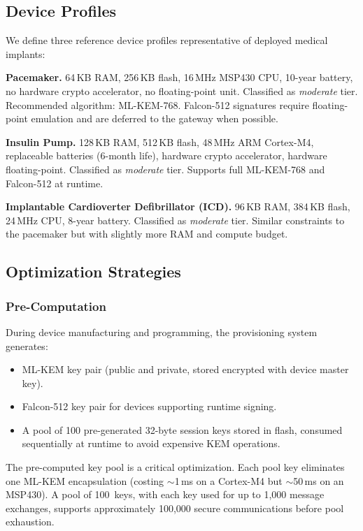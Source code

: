 \documentclass[conference,10pt]{IEEEtran}
\newcommand{\mlkem}{\textsf{ML-KEM}}
\begin{document}
\subsection{Device Profiles}

We define three reference device profiles representative of deployed medical implants:

\textbf{Pacemaker.} 64\,KB RAM, 256\,KB flash, 16\,MHz MSP430 CPU, 10-year battery, no hardware crypto accelerator, no floating-point unit. Classified as \emph{moderate} tier. Recommended algorithm: \mlkem{}-768. Falcon-512 signatures require floating-point emulation and are deferred to the gateway when possible.

\textbf{Insulin Pump.} 128\,KB RAM, 512\,KB flash, 48\,MHz ARM Cortex-M4, replaceable batteries (6-month life), hardware crypto accelerator, hardware floating-point. Classified as \emph{moderate} tier. Supports full \mlkem{}-768 and Falcon-512 at runtime.

\textbf{Implantable Cardioverter Defibrillator (ICD).} 96\,KB RAM, 384\,KB flash, 24\,MHz CPU, 8-year battery. Classified as \emph{moderate} tier. Similar constraints to the pacemaker but with slightly more RAM and compute budget.

\subsection{Optimization Strategies}

\subsubsection{Pre-Computation}
During device manufacturing and programming, the provisioning system generates:
\begin{itemize}[leftmargin=*]
    \item \mlkem{} key pair (public and private, stored encrypted with device master key).
    \item Falcon-512 key pair for devices supporting runtime signing.
    \item A pool of 100 pre-generated 32-byte session keys stored in flash, consumed sequentially at runtime to avoid expensive KEM operations.
\end{itemize}

The pre-computed key pool is a critical optimization. Each pool key eliminates one \mlkem{} encapsulation (costing ${\sim}$1\,ms on a Cortex-M4 but ${\sim}$50\,ms on an MSP430). A pool of 100~keys, with each key used for up to 1{,}000 message exchanges, supports approximately 100{,}000 secure communications before pool exhaustion.
\end{document}
